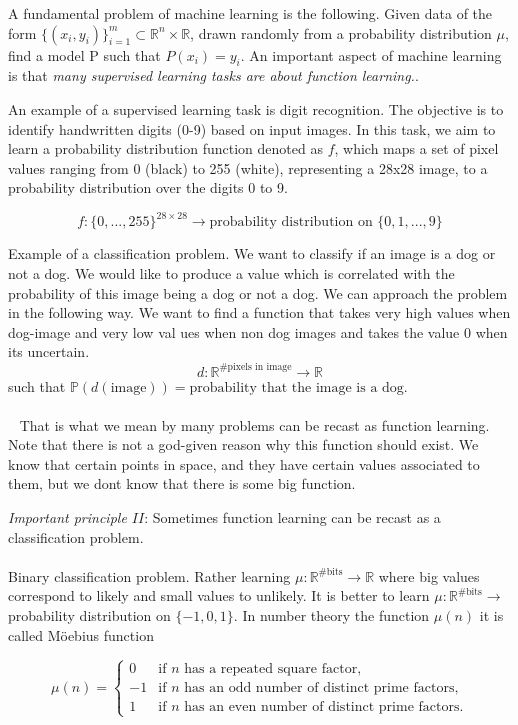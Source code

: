 \documentclass[../main.tex]{subfiles}
\begin{document}
	\noindent 
	A fundamental problem of machine learning is the following. Given data of the form $\{(x_i,y_i)\}^m_{i=1} \subset \mathbb{R}^n \times \mathbb{R}$, drawn randomly from a probability distribution $\mu$, find a model P such that $P(x_i)=y_i$. An important aspect of machine learning is that \textit{many supervised learning tasks are about function learning.}. 
\begin{xmpl}
	\noindent An example of a supervised learning task is digit recognition. The objective is to identify handwritten digits (0-9) based on input images. In this task, we aim to learn a probability distribution function denoted as $f$, which maps a set of pixel values ranging from 0 (black) to 255 (white), representing a 28x28 image, to a probability distribution over the digits 0 to 9.

$$f: \{0,..., 255\}^{28 \times 28} \longrightarrow \text{probability distribution on } \{0,1,...,9\}$$

\end{xmpl}
\begin{xmpl} Example of a classification problem. We want to classify if an image is a dog or not a dog. We would like to produce a value which is correlated with the probability of this image being a dog or not a dog.  We can approach the problem in the following way. We want to find a function that takes very high values when dog-image and very low val ues when non dog images and takes the value 0 when its uncertain. 
	$$d: \mathbb{R}^{\# \text{pixels in image}} \rightarrow \mathbb{R} $$
	such that $\mathbb{P}(d(\text{image})) = \text{probability that the image is a dog.}$ \\ \\  
	That is what we mean by many problems can be recast as function learning. Note that there is not a god-given reason why this function should exist. We know that certain points in space, and they have certain values associated to them, but we dont know that there is some big function. 
\end{xmpl}

\noindent \textit{Important principle $II$}: Sometimes function learning can be recast as a classification problem.  
\\ \\ 
Binary classification problem. 
Rather learning $\mu : \mathbb{R}^{\# \text{bits}} \rightarrow \mathbb{R}$ where big values correspond to likely and small values to unlikely. It is better to learn $\mu : \mathbb{R}^{\# \text{bits}} \rightarrow $ probability distribution on $\{-1,0,1\}$. In number theory the function $\mu(n)$ it is called Möebius function 

\[
\mu(n) = \begin{cases}
	0 & \text{if } n \text{ has a repeated square factor}, \\
	-1 & \text{if } n \text{ has an odd number of distinct prime factors}, \\
	1 & \text{if } n \text{ has an even number of distinct prime factors}.
\end{cases}
\]

	
	 
	
\end{document}
